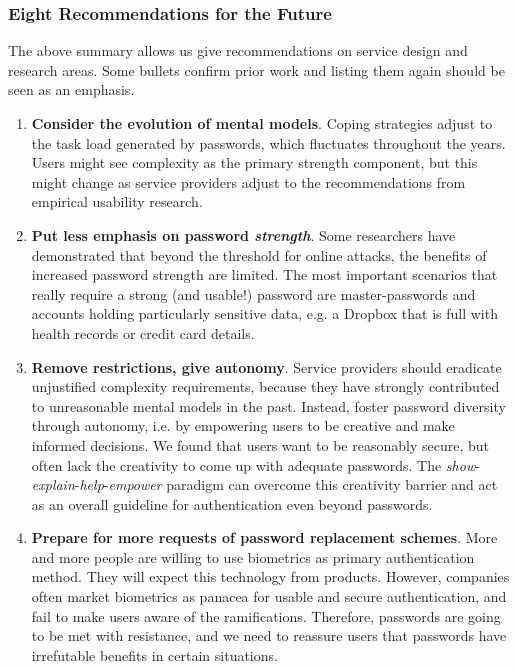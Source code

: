 \subsubsection{Eight Recommendations for the Future}\label{sec:summary:recommendations}
The above summary allows us give recommendations on service design and research areas. Some bullets confirm prior work and listing them again should be seen as an emphasis. 
\begin{enumerate}
	\item \textbf{Consider the evolution of mental models}. Coping strategies adjust to the task load generated by passwords, which fluctuates throughout the years. Users might see complexity as the primary strength component, but this might change as service providers adjust to the recommendations from empirical usability research. 
	
	\item \textbf{Put less emphasis on password \textit{strength}}. Some researchers have demonstrated that beyond the threshold for online attacks, the benefits of increased password strength are limited. The most important scenarios that really require a strong (and usable!) password are master-passwords and accounts holding particularly sensitive data, e.g. a Dropbox that is full with health records or credit card details. 
	
	\item \textbf{Remove restrictions, give autonomy}. Service providers should eradicate unjustified complexity requirements, because they have strongly contributed to unreasonable mental models in the past. Instead, foster password diversity through autonomy, i.e. by empowering users to be creative and make informed decisions. We found that users want to be reasonably secure, but often lack the creativity to come up with adequate passwords.
	The \textit{show}-\textit{explain}-\textit{help}-\textit{empower} paradigm can overcome this creativity barrier and act as an overall guideline for authentication even beyond passwords.
	
	\item \textbf{Prepare for more requests of password replacement schemes}. More and more people are willing to use biometrics as primary authentication method. They will expect this technology from products. However, companies often market biometrics as panacea for usable and secure authentication, and fail to make users aware of the ramifications. Therefore, passwords are going to be met with resistance, and we need to reassure users that passwords have irrefutable benefits in certain situations. 
		

\end{enumerate}
